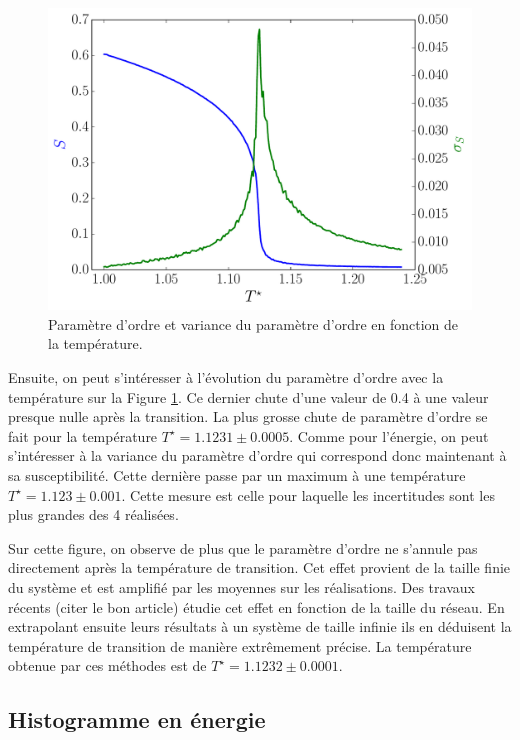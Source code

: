 \documentclass[11pt,a4paper]{article}
\numberwithin{equation}{section}
\begin{document}
\begin{figure}[h!]
    \centering	    
	\includegraphics[scale=0.6]{figures/local_order.pdf}
    \caption{Paramètre d'ordre et variance du paramètre d'ordre en fonction de la température.}
    	\label{local_order} 
\end{figure}

Ensuite, on peut s'intéresser à l'évolution du paramètre d'ordre avec la température sur la Figure \ref{local_order}. Ce dernier chute d'une valeur de 0.4 à une valeur presque nulle après la transition. La plus grosse chute de paramètre d'ordre se fait pour la température $T^\star = 1.1231 \pm 0.0005$. Comme pour l'énergie, on peut s'intéresser à la variance du paramètre d'ordre qui correspond donc maintenant à sa susceptibilité. Cette dernière passe par un maximum à une température $T^\star = 1.123 \pm 0.001$. Cette mesure est celle pour laquelle les incertitudes sont les plus grandes des 4 réalisées.
\medskip

Sur cette figure, on observe de plus que le paramètre d'ordre ne s'annule pas directement après la température de transition. Cet effet provient de la taille finie du système et est amplifié par les moyennes sur les réalisations. Des travaux récents (citer le bon article) étudie cet effet en fonction de la taille du réseau. En extrapolant ensuite leurs résultats à un système de taille infinie ils en déduisent la température de transition de manière extrêmement précise. La température obtenue par ces méthodes est de $T^\star = 1.1232 \pm 0.0001$.


\subsection{Histogramme en énergie}
\end{document}
